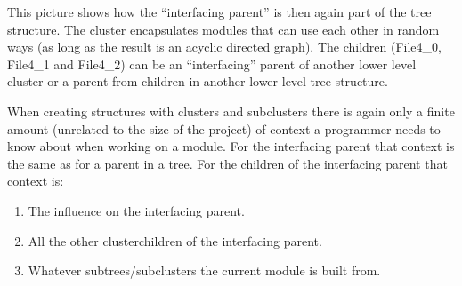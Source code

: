 \documentclass{article}
\begin{document}


This picture shows how the “interfacing parent” is then again part of the tree structure. The cluster encapsulates modules that can use each other in random ways (as long as the result is an acyclic directed graph). The children (File4\_0, File4\_1 and File4\_2) can be an “interfacing” parent of another lower level cluster or a parent from children in another lower level tree structure.

When creating structures with clusters and subclusters there is again only a finite amount (unrelated to the size of the project) of context a programmer needs to know about when working on a module. For the interfacing parent that context is the same as for a parent in a tree. For the children of the interfacing parent that context is:

\begin{enumerate}
    \item The influence on the interfacing parent.
    \item All the other clusterchildren of the interfacing parent.
    \item Whatever subtrees/subclusters the current module is built from.
\end{enumerate}

\end{document}

